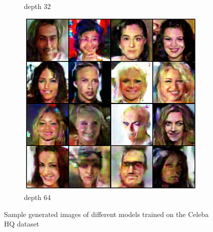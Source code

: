 \begin{frame}
\begin{center}
\begin{figure}[H]
\begin{subfigure}[b]{0.24\textwidth}
                \caption{depth 32}
                \label{fig:celeba_32}
            \end{subfigure}
            \hfill
            \begin{subfigure}[b]{0.24\textwidth}
                \centering
                \includegraphics[width=\textwidth]{resources/images/output_celeba_64.eps}
                \caption{depth 64}
                \label{fig:celeba_64}
            \end{subfigure}
            \caption{Sample generated images of different models trained on the Celeba HQ dataset}
            \label{fig:output_celeba}
        \end{figure}
    
    \end{center}
\end{frame}


